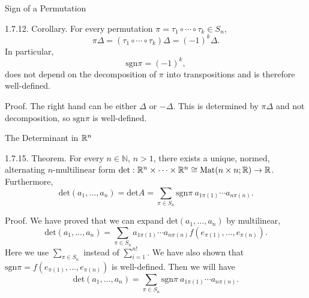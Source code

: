 \documentclass[hyperref={pdfpagelabels=true}]{beamer}
\newcommand{\N}{\mathbb{N}}
\newcommand{\Mat}{\text{Mat}}
\newcommand{\<}{\langle}
\renewcommand{\>}{\rangle}
\newenvironment{shrinkeq}[1]%
{ \bgroup
  \addtolength\abovedisplayshortskip{#1}
  \addtolength\abovedisplayskip{#1}
  \addtolength\belowdisplayshortskip{#1}
  \addtolength\belowdisplayskip{#1}}
{\egroup\ignorespacesafterend}
\begin{document}
    \begin{frame}{Sign of a Permutation}
        \begin{block}{1.7.12. Corollary.}
            For every permutation $\pi = \tau_{1} \circ \cdots \circ \tau_{k} \in S_{n}$,
            \[\pi\Delta = (\tau_{1} \circ \cdots \circ \tau_{k})\Delta = (-1)^{k}\Delta.\]
            In particular,
            \[\text{sgn}\pi = (-1)^{k},\]
            does not depend on the decomposition of $\pi$ into transpositions and is therefore well-defined.
        \end{block}
        \begin{block}{Proof.}
            The right hand can be either $\Delta$ or $-\Delta$. This is determined by $\pi\Delta$ and not decomposition, so $\text{sgn}\pi$ is well-defined.
        \end{block}
    \end{frame}
    \begin{frame}{The Determinant in $\mathbb{R}^{n}$}
        \begin{block}{1.7.15. Theorem.}
            For every $n \in \N$, $n>1$, there exists a unique, normed, alternating $n$-multilinear form $\text{det}:\R^{n} \times \cdots \times \R^{n} \cong \Mat(n \times n;\R) \rightarrow \R$.\\
            Furthermore,
            \begin{shrinkeq}{-0.3em}
            \[\text{det}(a_{1},...,a_{n}) = \text{det}A = \sum_{\pi \in S_{n}}\text{sgn}\pi\ a_{1\pi(1)} \cdots a_{n\pi(n)}.\]
            \end{shrinkeq}
        \end{block}
        \begin{block}{Proof.}
            We have proved that we can expand $\text{det}(a_{1},...,a_{n})$ by multilinear,
            \begin{shrinkeq}{-0.3em}
            \[\text{det}(a_{1},...,a_{n}) = \sum_{\pi \in S_{n}}a_{1\pi(1)} \cdots a_{n\pi(n)}f(e_{\pi(1)},...,e_{\pi(n)}).\]
            \end{shrinkeq}
            Here we use $\sum_{\pi \in S_{n}}$ instead of $\sum_{i = 1}^{n!}$. We have also shown that $\text{sgn}\pi = f(e_{\pi(1)},...,e_{\pi(n)})$ is well-defined.
            Then we will have
            \begin{shrinkeq}{-0.3em} 
            \[\text{det}(a_{1},...,a_{n}) = \sum_{\pi \in S_{n}}\text{sgn}\pi \ a_{1\pi(1)} \cdots a_{n\pi(n)}.\]
            \end{shrinkeq}
            
        \end{block}
    \end{frame}
\end{document}
